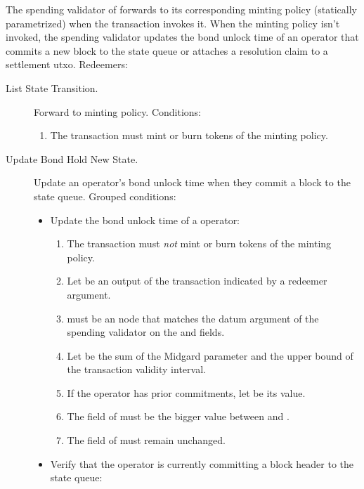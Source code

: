 \documentclass[../midgard.tex]{subfiles}
\begin{document}
The spending validator of  forwards to its corresponding minting policy (statically parametrized) when the transaction invokes it.
When the minting policy isn't invoked, the spending validator updates the bond unlock time of an operator that commits a new block to the state queue or attaches a resolution claim to a settlement utxo.
Redeemers:
\begin{description}
    \item[List State Transition.] Forward to minting policy.
      Conditions:
        \begin{enumerate}
            \item The transaction must mint or burn tokens of the  minting policy.
        \end{enumerate}
    \item[Update Bond Hold New State.] Update an operator's bond unlock time when they commit a block to the state queue.
      Grouped conditions:
        \begin{itemize}
            \item Update the bond unlock time of a operator:
            \begin{enumerate} 
                \item The transaction must \emph{not} mint or burn tokens of the  minting policy.
                \item Let  be an output of the transaction indicated by a redeemer argument.
                \item {} must be an  node that matches the datum argument of the spending validator on the  and  fields.
                \item Let  be the sum of the Midgard  parameter and the upper bound of the transaction validity interval.
                \item If the operator has prior commitments, let  be its value.
                \item The  field of  must be the bigger value between  and .
                \item The  field of  must remain unchanged.
            \end{enumerate}
            \item Verify that the operator is currently committing a block header to the state queue:

\end{itemize}
\end{description}
\end{document}
